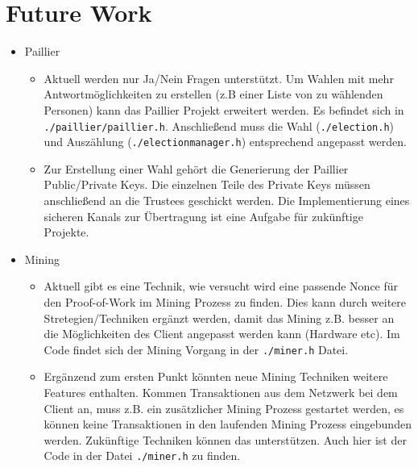 \documentclass[colorback,accentcolor=tud1b]{tudreport}
\begin{document}
\section{Future Work}
\begin{itemize}

\item Paillier
\begin{itemize}
	\item Aktuell werden nur Ja/Nein Fragen unterstützt. Um Wahlen mit mehr Antwortmöglichkeiten zu erstellen (z.B einer Liste von zu wählenden Personen) kann das Paillier Projekt erweitert werden. Es befindet sich in \texttt{./paillier/paillier.h}. Anschließend muss die Wahl (\texttt{./election.h}) und Auszählung (\texttt{./electionmanager.h}) entsprechend angepasst werden.
	\item Zur Erstellung einer Wahl gehört die Generierung der Paillier Public/Private Keys. Die einzelnen Teile des Private Keys müssen anschließend an die Trustees geschickt werden. Die Implementierung eines sicheren Kanals zur Übertragung ist eine Aufgabe für zukünftige Projekte.
\end{itemize} 

\newpage
\item Mining
\begin{itemize}
	\item Aktuell gibt es eine Technik, wie versucht wird eine passende Nonce für den Proof-of-Work im Mining Prozess zu finden. Dies kann durch weitere Stretegien/Techniken ergänzt werden, damit das Mining z.B. besser an die Möglichkeiten des Client angepasst werden kann (Hardware etc). Im Code findet sich der Mining Vorgang in der \texttt{./miner.h} Datei.
	\item Ergänzend zum ersten Punkt könnten neue Mining Techniken weitere Features enthalten. Kommen Transaktionen aus dem Netzwerk bei dem Client an, muss z.B. ein zusätzlicher Mining Prozess gestartet werden, es können keine Transaktionen in den laufenden Mining Prozess eingebunden werden. Zukünftige Techniken können das unterstützen. Auch hier ist der Code in der Datei \texttt{./miner.h} zu finden.
\end{itemize}


\end{itemize}
\end{document}
